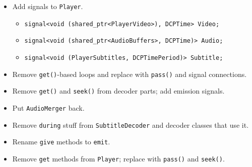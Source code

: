 \documentclass{article}
\begin{document}
\begin{itemize}
\item Add signals to \texttt{Player}.
  \begin{itemize}
    \item \texttt{signal<void (shared\_ptr<PlayerVideo>), DCPTime> Video;}
    \item \texttt{signal<void (shared\_ptr<AudioBuffers>, DCPTime)> Audio;}
    \item \texttt{signal<void (PlayerSubtitles, DCPTimePeriod)> Subtitle;}
  \end{itemize}
  \item Remove \texttt{get()}-based loops and replace with \texttt{pass()} and signal connections.
  \item Remove \texttt{get()} and \texttt{seek()} from decoder parts; add emission signals.
  \item Put \texttt{AudioMerger} back.
  \item Remove \texttt{during} stuff from \texttt{SubtitleDecoder} and decoder classes that use it.
  \item Rename \texttt{give} methods to \texttt{emit}.
  \item Remove \texttt{get} methods from \texttt{Player}; replace with \texttt{pass()} and \texttt{seek()}.
\end{itemize}
\end{document}
